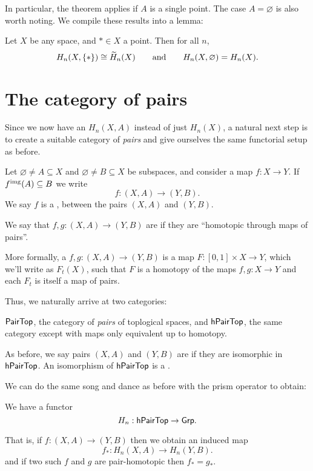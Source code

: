 In particular, the theorem applies if $A$ is a single point.
The case $A = \varnothing$ is also worth noting.
We compile these results into a lemma:
\begin{lemma}
	Let $X$ be any space, and $\ast \in X$ a point. Then for all $n$,
	\[
		H_n(X, \{\ast\}) \cong \widetilde H_n(X)
		\qquad\text{and}\qquad
		H_n(X, \varnothing) = H_n(X).
	\]
\end{lemma}

\section{The category of pairs}
Since we now have an $H_n(X,A)$ instead of just $H_n(X)$,
a natural next step is to create a suitable category of \emph{pairs}
and give ourselves the same functorial setup as before.

\begin{definition}
	Let $\varnothing \neq A \subseteq X$ and $\varnothing \neq B \subseteq X$
	be subspaces, and consider a map $f : X \to Y$.
	If $f^{\text{img}}(A) \subseteq B$ we write
	\[ f : (X,A) \to (Y,B). \]
	We say $f$ is a ,
	between the pairs $(X,A)$ and $(Y,B)$.
\end{definition}
\begin{definition}
	We say that $f,g : (X,A) \to (Y,B)$ are  if they
	are ``homotopic through maps of pairs''.

	More formally, a 
	$f, g : (X,A) \to (Y,B)$ is a map $F : [0,1] \times X \to Y$,
	which we'll write as $F_t(X)$, such that
	$F$ is a homotopy of the maps $f,g : X \to Y$
	and each $F_t$ is itself a map of pairs.
\end{definition}
Thus, we naturally arrive at two categories:
\begin{itemize}
	\ii $\mathsf{PairTop}$, the category of \emph{pairs} of
	toplogical spaces, and
	\ii $\mathsf{hPairTop}$, the same category except
	with maps only equivalent up to homotopy.
\end{itemize}
\begin{definition}
	As before, we say pairs $(X,A)$ and $(Y,B)$ are
	if they are isomorphic in $\mathsf{hPairTop}$.
	An isomorphism of $\mathsf{hPairTop}$ is a
	.
\end{definition}

We can do the same song and dance as before with the prism operator to obtain:
\begin{lemma}
	We have a functor
	\[ H_n : \mathsf{hPairTop} \to \mathsf{Grp}. \]
\end{lemma}
That is, if $f : (X,A) \to (Y,B)$ then we obtain an induced map
\[ f_\ast : H_n(X,A) \to H_n(Y,B). \]
and if two such $f$ and $g$ are pair-homotopic
then $f_\ast = g_\ast$.


